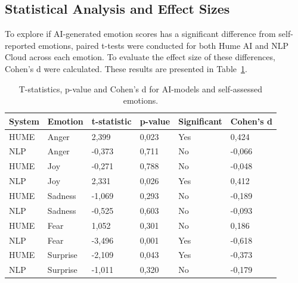 \subsection{Statistical Analysis and Effect Sizes}

To explore if AI-generated emotion scores has a significant difference from self-reported emotions, paired t-tests were conducted for both Hume AI and NLP Cloud across each emotion. 
To evaluate the effect size of these differences, Cohen's d were calculated. These results are presented in Table~\ref{tab:t-test-rq3}.
\begin{table}[!h]
    \centering
    \begin{tabular}{l|lllll}
    \textbf{System} & \textbf{Emotion} & \textbf{t-statistic} & \textbf{p-value} & \textbf{Significant} & \textbf{Cohen's d} \\ \hline
    HUME            & Anger            & 2,399                & 0,023            & Yes                  & 0,424              \\
    NLP             & Anger            & -0,373               & 0,711            & No                   & -0,066             \\
    HUME            & Joy              & -0,271               & 0,788            & No                   & -0,048             \\
    NLP             & Joy              & 2,331                & 0,026            & Yes                  & 0,412              \\
    HUME            & Sadness          & -1,069               & 0,293            & No                   & -0,189             \\
    NLP             & Sadness          & -0,525               & 0,603            & No                   & -0,093             \\
    HUME            & Fear             & 1,052                & 0,301            & No                   & 0,186              \\
    NLP             & Fear             & -3,496               & 0,001            & Yes                  & -0,618             \\
    HUME            & Surprise         & -2,109               & 0,043            & Yes                  & -0,373             \\
    NLP             & Surprise         & -1,011               & 0,320            & No                   & -0,179            
    \end{tabular}
    \caption{T-statistics, p-value and Cohen's d for AI-models and self-assessed emotions.}
    \label{tab:t-test-rq3}
\end{table}

